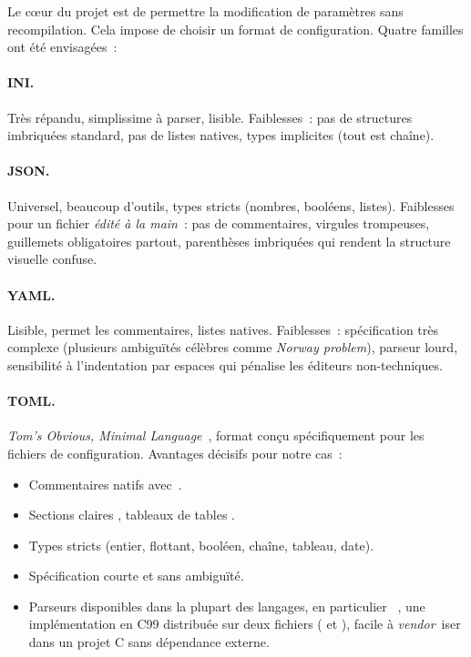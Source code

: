 Le cœur du projet est de permettre la modification de paramètres
sans recompilation. Cela impose de choisir un format de
configuration. Quatre familles ont été envisagées~:

\paragraph{INI.} Très répandu, simplissime à parser, lisible.
Faiblesses~: pas de structures imbriquées standard, pas de
listes natives, types implicites (tout est chaîne).

\paragraph{JSON.} Universel, beaucoup d'outils, types stricts
(nombres, booléens, listes). Faiblesses pour un fichier
\emph{édité à la main}~: pas de commentaires, virgules
trompeuses, guillemets obligatoires partout, parenthèses
imbriquées qui rendent la structure visuelle confuse.

\paragraph{YAML.} Lisible, permet les commentaires, listes
natives. Faiblesses~: spécification très complexe (plusieurs
ambiguïtés célèbres comme \emph{Norway problem}), parseur lourd,
sensibilité à l'indentation par espaces qui pénalise les éditeurs
non-techniques.

\paragraph{TOML.} \emph{Tom's Obvious, Minimal
Language}~\cite{tomlspec}, format conçu spécifiquement pour les
fichiers de configuration. Avantages décisifs pour notre cas~:

\begin{itemize}
  \item Commentaires natifs avec~\code{\#}.
  \item Sections claires \code{[global]}, tableaux de tables
    \code{[[species]]}.
  \item Types stricts (entier, flottant, booléen, chaîne, tableau,
    date).
  \item Spécification courte et sans ambiguïté.
  \item Parseurs disponibles dans la plupart des langages, en
    particulier ~\cite{tomlc99}, une implémentation
    en C99 distribuée sur deux fichiers ( et
    ), facile à \emph{vendor}~iser dans un projet C
    sans dépendance externe.
\end{itemize}


